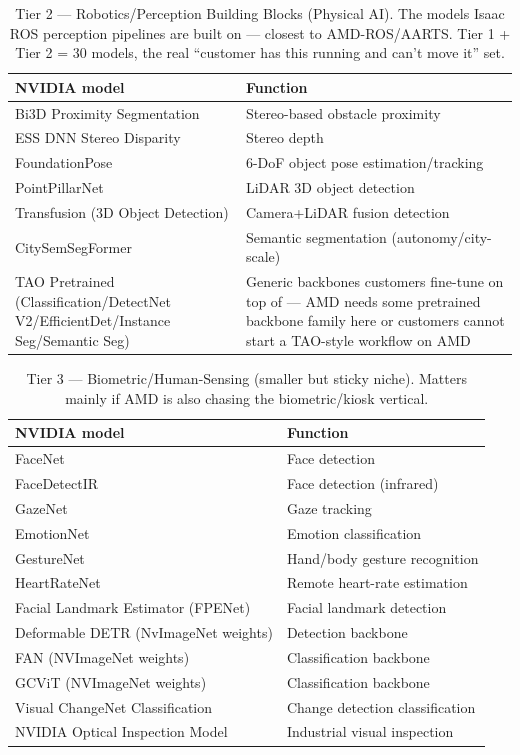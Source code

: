 \documentclass[blind]{gtac}
\begin{document}
\begin{table}[H]
\centering
\caption{Tier 2 --- Robotics/Perception Building Blocks (Physical AI). The models Isaac ROS perception pipelines are built on --- closest to AMD-ROS/AARTS. Tier 1 + Tier 2 = 30 models, the real ``customer has this running and can't move it'' set.}
\label{tab:a2}
\tiny
\begin{tabular}{@{}p{0.95in}p{1.4in}@{}}
\toprule
NVIDIA model & Function \\
\midrule
Bi3D Proximity Segmentation & Stereo-based obstacle proximity \\
ESS DNN Stereo Disparity & Stereo depth \\
FoundationPose & 6-DoF object pose estimation/tracking \\
PointPillarNet & LiDAR 3D object detection \\
Transfusion (3D Object Detection) & Camera+LiDAR fusion detection \\
CitySemSegFormer & Semantic segmentation (autonomy/city-scale) \\
TAO Pretrained (Classification/DetectNet V2/EfficientDet/Instance Seg/Semantic Seg) & Generic backbones customers fine-tune on top of --- AMD needs some pretrained backbone family here or customers cannot start a TAO-style workflow on AMD \\
\bottomrule
\end{tabular}
\end{table}

\begin{table}[H]
\centering
\caption{Tier 3 --- Biometric/Human-Sensing (smaller but sticky niche). Matters mainly if AMD is also chasing the biometric/kiosk vertical.}
\label{tab:a3}
\tiny
\begin{tabular}{@{}p{0.95in}p{1.4in}@{}}
\toprule
NVIDIA model & Function \\
\midrule
FaceNet & Face detection \\
FaceDetectIR & Face detection (infrared) \\
GazeNet & Gaze tracking \\
EmotionNet & Emotion classification \\
GestureNet & Hand/body gesture recognition \\
HeartRateNet & Remote heart-rate estimation \\
Facial Landmark Estimator (FPENet) & Facial landmark detection \\
Deformable DETR (NvImageNet weights) & Detection backbone \\
FAN (NVImageNet weights) & Classification backbone \\
GCViT (NVImageNet weights) & Classification backbone \\
Visual ChangeNet Classification & Change detection classification \\
NVIDIA Optical Inspection Model & Industrial visual inspection \\
\bottomrule
\end{tabular}
\end{table}
\end{document}
